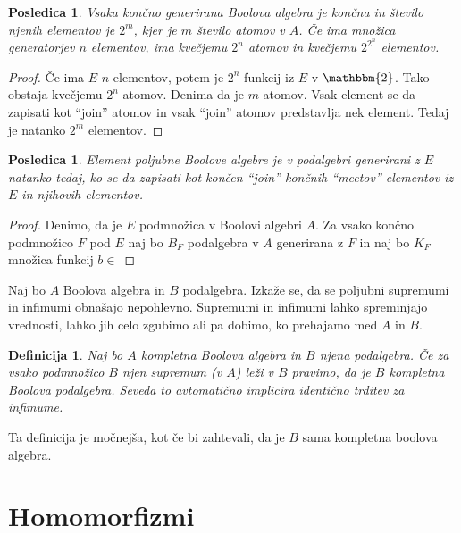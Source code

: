 \documentclass{amsart}
\newtheorem{posledica}[izrek]{Posledica}
\newtheorem{definicija}[izrek]{Definicija}
\begin{document}
\begin{posledica}
    Vsaka končno generirana Boolova algebra  je končna in število njenih elementov je 
    $2^m$, kjer je $m$ število atomov v $A$. Če ima množica generatorjev $n$ elementov, 
    ima kvečjemu $2^n$ atomov in kvečjemu $2^{2^n}$ elementov.
\end{posledica}

\begin{proof}
    Če ima $E$ $n$ elementov, potem je $2^n$ funkcij iz $E$ v $\mathbbm{2}$.
    Tako obstaja kvečjemu $2^n$ atomov. Denima da je $m$ atomov. 
    Vsak element se da zapisati kot ``join'' atomov 
    in vsak ``join'' atomov predstavlja nek element. 
    Tedaj je natanko $2^{m}$ elementov.
\end{proof}

\begin{posledica}
    Element poljubne Boolove algebre je v podalgebri generirani z $E$ natanko tedaj,
    ko se da zapisati kot končen ``join'' končnih ``meetov'' elementov iz $E$ 
    in njihovih elementov.
\end{posledica}

\begin{proof}
    Denimo, da je $E$ podmnožica v Boolovi algebri $A$. Za vsako končno podmnožico $F$ pod $E$
    naj bo $B_F$ podalgebra v $A$ generirana z $F$ in naj bo $K_F$ množica funkcij
    $b \in$ 
\end{proof}


Naj bo $A$ Boolova algebra in $B$ podalgebra.
Izkaže se, da se poljubni supremumi in infimumi obnašajo nepohlevno.
Supremumi in infimumi lahko spreminjajo vrednosti, lahko jih celo zgubimo ali pa dobimo,
ko prehajamo med $A$ in $B$.

\begin{definicija}
    Naj bo $A$ kompletna Boolova algebra in $B$ njena podalgebra.
    Če za vsako podmnožico $B$ njen supremum (v $A$) leži v $B$ pravimo, da je 
    $B$ kompletna Boolova podalgebra. Seveda to avtomatično implicira identično trditev za infimume.
\end{definicija}

Ta definicija je močnejša, kot če bi zahtevali, da je $B$ sama kompletna boolova algebra.


\section{Homomorfizmi}
\end{document}
